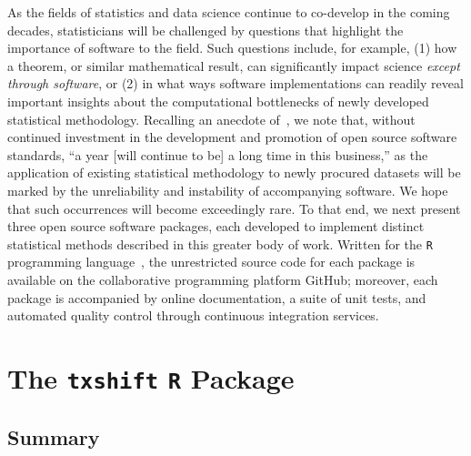 As the fields of statistics and data science continue to co-develop in the
coming decades, statisticians will be challenged by questions that highlight the
importance of software to the field. Such questions include, for example, (1)
how a theorem, or similar mathematical result, can significantly impact science
\textit{except through software}, or (2) in what ways software implementations
can readily reveal important insights about the computational bottlenecks of
newly developed statistical methodology. Recalling an anecdote
of~\citet{buckheit1995wavelab}, we note that, without continued investment in
the development and promotion of open source software standards, ``a year [will
continue to be] a long time in this business,'' as the application of existing
statistical methodology to newly procured datasets will be marked by the
unreliability and instability of accompanying software. We hope that such
occurrences will become exceedingly rare. To that end, we next present three
open source software packages, each developed to implement distinct statistical
methods described in this greater body of work. Written for the \texttt{R}
programming language~\citep{R}, the unrestricted source code for each package is
available on the collaborative programming platform GitHub; moreover, each
package is accompanied by online documentation, a suite of unit tests, and
automated quality control through continuous integration services.

\section{The \texttt{txshift} \texttt{R} Package}\label{pkg_txshift}

\subsection{Summary}

